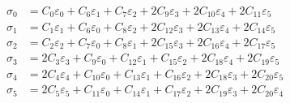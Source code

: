 \begin{equation}\begin{aligned}
\sigma_{0} &= {{C}_{0}} {{\varepsilon}_{0}} + {{C}_{6}} {{\varepsilon}_{1}} + {{C}_{7}} {{\varepsilon}_{2}} + 2 {{C}_{9}} {{\varepsilon}_{3}} + 2 {{C}_{10}} {{\varepsilon}_{4}} + 2 {{C}_{11}} {{\varepsilon}_{5}}\\
\sigma_{1} &= {{C}_{1}} {{\varepsilon}_{1}} + {{C}_{6}} {{\varepsilon}_{0}} + {{C}_{8}} {{\varepsilon}_{2}} + 2 {{C}_{12}} {{\varepsilon}_{3}} + 2 {{C}_{13}} {{\varepsilon}_{4}} + 2 {{C}_{14}} {{\varepsilon}_{5}}\\
\sigma_{2} &= {{C}_{2}} {{\varepsilon}_{2}} + {{C}_{7}} {{\varepsilon}_{0}} + {{C}_{8}} {{\varepsilon}_{1}} + 2 {{C}_{15}} {{\varepsilon}_{3}} + 2 {{C}_{16}} {{\varepsilon}_{4}} + 2 {{C}_{17}} {{\varepsilon}_{5}}\\
\sigma_{3} &= 2 {{C}_{3}} {{\varepsilon}_{3}} + {{C}_{9}} {{\varepsilon}_{0}} + {{C}_{12}} {{\varepsilon}_{1}} + {{C}_{15}} {{\varepsilon}_{2}} + 2 {{C}_{18}} {{\varepsilon}_{4}} + 2 {{C}_{19}} {{\varepsilon}_{5}}\\
\sigma_{4} &= 2 {{C}_{4}} {{\varepsilon}_{4}} + {{C}_{10}} {{\varepsilon}_{0}} + {{C}_{13}} {{\varepsilon}_{1}} + {{C}_{16}} {{\varepsilon}_{2}} + 2 {{C}_{18}} {{\varepsilon}_{3}} + 2 {{C}_{20}} {{\varepsilon}_{5}}\\
\sigma_{5} &= 2 {{C}_{5}} {{\varepsilon}_{5}} + {{C}_{11}} {{\varepsilon}_{0}} + {{C}_{14}} {{\varepsilon}_{1}} + {{C}_{17}} {{\varepsilon}_{2}} + 2 {{C}_{19}} {{\varepsilon}_{3}} + 2 {{C}_{20}} {{\varepsilon}_{4}}\\
\end{aligned}\end{equation}

